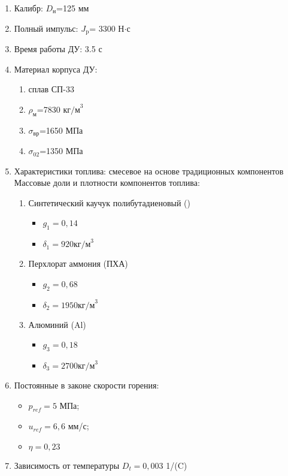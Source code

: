 \begin{enumerate}[1.]
	\item Калибр:				     $D_\text{н}$=125 мм  
	\item Полный импульс:		 	 $J_\text{p}$= 3300 Н$\cdot$с  
	\item Время работы ДУ:	 	3.5 с  
	\item Материал корпуса ДУ:
	\begin{enumerate}
 		\item сплав СП-33 
		\item $\rho_\text{м}$=7830  $\text{кг/м}^3$
		\item $\sigma_\text{вр}$=1650 МПа	  
		\item $\sigma_\text{02}$=1350 МПа	  
	\end{enumerate}
	\item Характеристики топлива: смесевое на основе традиционных компонентов \\
		Массовые доли и плотности компонентов топлива:
	\begin{enumerate}
		\item Синтетический каучук полибутадиеновый ()	
			\begin{itemize}
				\item $g_1=0,14$		
				\item $\delta_1=920 \text{кг/м}^3$ 
			\end{itemize}
		\item Перхлорат аммония (ПХА)	
			\begin{itemize}
				\item $g_2=0,68$		
				\item $\delta_2=1950 \text{кг/м}^3$ 
			\end{itemize}
		\item Алюминий (Al)			
			\begin{itemize}
				\item $g_3=0,18$		
				\item $\delta_3=2700 \text{кг/м}^3$ 
			\end{itemize}
	\end{enumerate}
	\item Постоянные в законе скорости горения:
	\begin{itemize}
		\item $p_{ref}=5 $ МПа;
		\item $u_{ref} = 6,6$ мм/с;
		\item $\eta=0,23$
	\end{itemize}
	\item Зависимость от температуры $D_t=0,003 $ 1/(\textdegree C)
\end{enumerate}

